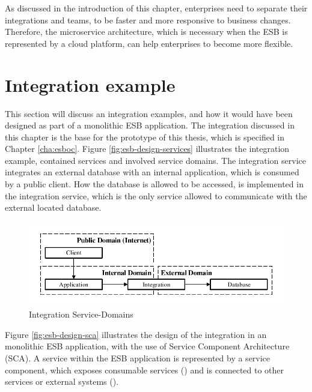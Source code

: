 As discussed in the introduction of this chapter, enterprises need to separate their integrations and teams, to be faster and more responsive to business changes. Therefore, the microservice architecture, which is necessary when the ESB is represented by a cloud platform, can help enterprises to become more flexible.

\section{Integration example}
\label{sec:esb-integration-example}
This section will discuss an integration examples, and how it would have been designed as part of a monolithic ESB application. The integration discussed in this chapter is the base for the prototype of this thesis, which is specified in Chapter \vref{cha:esboc}. Figure \vref{fig:esb-design-services} illustrates the integration example, contained services and involved service domains. The integration service integrates an external database with an internal application, which is consumed by a public client. How the database is allowed to be accessed, is implemented in the integration service, which is the only service allowed to communicate with the external located database.
\newpage

\begin{figure}[htbp]
	\centering
	\includegraphics[scale=1]{images/esb-integration-example.pdf}
	\caption{Integration Service-Domains}
	\label{fig:esb-design-services}
\end{figure}

Figure \vref{fig:esb-design-sca} illustrates the design of the integration in an monolithic ESB application, with the use of Service Component Architecture (SCA). A service within the ESB application is represented by a service component, which exposes consumable services () and is connected to other services or external systems (). 

